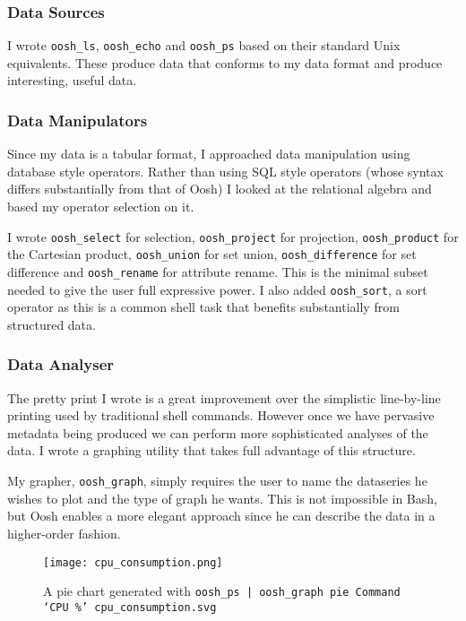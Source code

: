 \documentclass[12pt,twoside,notitlepage]{report}
\begin{document}

\subsubsection{Data Sources}
I wrote {\tt oosh\_ls}, {\tt oosh\_echo} and {\tt oosh\_ps} based on their
standard Unix equivalents. These produce data that conforms to my data
format and produce interesting, useful data.

\subsubsection{Data Manipulators}
Since my data is a tabular format, I approached data manipulation
using database style operators. Rather than using SQL style operators
(whose syntax differs substantially from that of Oosh) I looked at the
relational algebra and based my operator selection on it.

I wrote {\tt oosh\_select} for selection, {\tt oosh\_project} for
projection, {\tt oosh\_product} for the Cartesian product,
{\tt oosh\_union} for set union, {\tt oosh\_difference} for set difference
and {\tt oosh\_rename} for attribute rename. This is the minimal subset
needed to give the user full expressive power. I also added
{\tt oosh\_sort}, a sort operator as this is a common shell task that
benefits substantially from structured data.

\subsubsection{Data Analyser}
The pretty print I wrote is a great improvement over the simplistic
line-by-line printing used by traditional shell commands. However once
we have pervasive metadata being produced we can perform more
sophisticated analyses of the data. I wrote a graphing utility that
takes full advantage of this structure.

My grapher, {\tt oosh\_graph}, simply requires the user to name the
dataseries he wishes to plot and the type of graph he wants. This is
not impossible in Bash, but Oosh enables a more elegant approach since
he can describe the data in a higher-order fashion.

\begin{figure}[h]
  \caption{A pie chart generated with {\tt oosh\_ps | oosh\_graph pie Command `CPU \%' cpu\_consumption.svg}}
  \centering
  \texttt{[image: cpu\_consumption.png]}
\end{figure}
\end{document}
